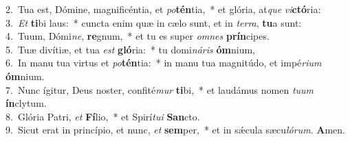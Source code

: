 {2.~}Tua est, Dómine, magnificéntia, et \textit{po}\textbf{tén}tia,~* et glória, at\textit{que} \textit{vi}\textbf{ctó}ria:\\
{3.~}\textit{Et} \textbf{ti}bi laus:~* cuncta enim quæ in cælo sunt, et in \textit{ter}\textit{ra}, \textbf{tu}a sunt:\\
{4.~}Tuum, Dómi\textit{ne}, \textbf{re}gnum,~* et tu es super \textit{om}\textit{nes} \textbf{prín}cipes.\\
{5.~}Tuæ divítiæ, et tua \textit{est} \textbf{gló}ria:~* tu domi\textit{ná}\textit{ris} \textbf{óm}nium,\\
{6.~}In manu tua virtus et \textit{po}\textbf{tén}tia:~* in manu tua magnitúdo, et impé\textit{ri}\textit{um} \textbf{óm}nium.\\
{7.~}Nunc ígitur, Deus noster, confité\textit{mur} \textbf{ti}bi,~* et laudámus nomen \textit{tu}\textit{um} \textbf{ín}clytum.\\
{8.~}Glória Patri, \textit{et} \textbf{Fí}lio,~* et Spirí\textit{tu}\textit{i} \textbf{San}cto.\\
{9.~}Sicut erat in princípio, et nunc, \textit{et} \textbf{sem}per,~* et in sǽcula sæcu\textit{ló}\textit{rum}. \textbf{A}men.\\
